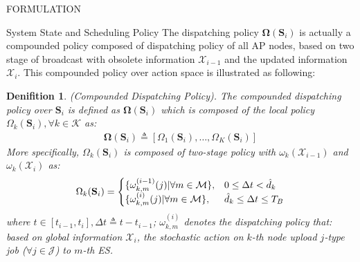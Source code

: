 \documentclass[10pt, conference, letterpaper]{IEEEtran}
\newtheorem{definition}{Denifition}
\newcommand{\define}{\triangleq}
\renewcommand{\vec}{\mathbf}
\DeclarePairedDelimiter{\set}{\{}{\}}
\newcommand{\apSet}{\mathcal{K}}
\newcommand{\esSet}{\mathcal{M}}
\newcommand{\jSet}{\mathcal{J}}
\newcommand{\Stat}{\mathbf{S}}
\newcommand{\Obsv}{\mathcal{X}}
\newcommand{\Policy}{\mathbf{\Omega}}
\begin{document}
\begin{section}{FORMULATION}
\begin{subsection}{System State and Scheduling Policy}
            The dispatching policy $\vec{\Omega}(\Stat_i)$ is actually a compounded policy composed of dispatching policy of all AP nodes, based on two stage of broadcast with obsolete information $\Obsv_{i-1}$ and the updated information $\Obsv_{i}$. This compounded policy over action space is illustrated as following:
            \begin{definition}(Compounded Dispatching Policy).
                The compounded dispatching policy over $\Stat_{i}$ is defined as $\Policy(\Stat_{i})$ which is composed of the local policy $\Omega_k(\Stat_{i}), \forall k\in\apSet$ as:
                \begin{align}
                    \vec{\Omega}(\Stat_{i}) \triangleq [\Omega_1(\Stat_{i}), \dots, \Omega_K(\Stat_{i})]
                \end{align}
                More specifically, $\Omega_k(\Stat_{i})$ is composed of two-stage policy with $\omega_k(\Obsv_{i-1})$ and $\omega_k(\Obsv_{i})$ as:
                \begin{align}
                    \Omega_k(\Stat_i) = 
                    \begin{cases}
                        \set{\omega^{(i-1)}_{k,m}(j)|\forall m\in\esSet}, & 0 \leq \Delta{t} < \hat{d}_k
                        \\
                        \set{\omega^{(i)}_{k,m}(j)|\forall m\in\esSet}, & \hat{d}_k \leq \Delta{t} \leq T_B
                    \end{cases}
                \end{align}
                where $t\in[t_{i-1}, t_{i}], \Delta{t} \define t - t_{i-1}$; $\omega^{(i)}_{k,m}$ denotes the dispatching policy that: based on global information $\Obsv_{i}$, the stochastic action on $k$-th node upload $j$-type job ($\forall j\in\jSet$) to $m$-th ES.
            \end{definition}
        \end{subsection}


\end{section}
\end{document}
